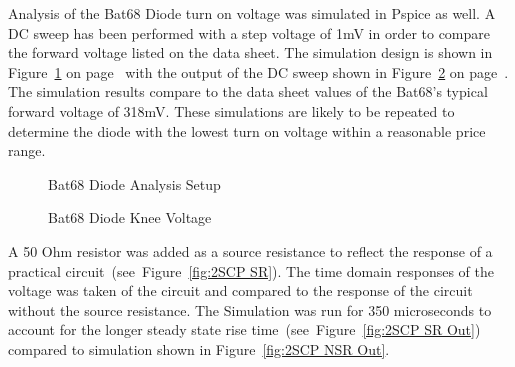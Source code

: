 \documentclass[12pt]{article}
\begin{document}
	\noindent Analysis of the Bat68 Diode turn on voltage was simulated in Pspice as well. A DC sweep has been performed with a step voltage of 1mV in order to compare the forward voltage listed on the data sheet. The simulation design is shown in Figure~\ref{fig:Bat68Analysis} on page~\pageref{fig:Bat68Analysis} with the output of the DC sweep shown in Figure~\ref{fig:Bat68Knee} on page~\pageref{fig:Bat68Knee}. The simulation results compare to the data sheet values of the Bat68's typical forward voltage of 318mV. These simulations are likely to be repeated to determine the diode with the lowest turn on voltage within a reasonable price range.

\vspace{0.5em}
\begin{figure}[H]
\caption{Bat68 Diode Analysis Setup}
\label{fig:Bat68Analysis}
\end{figure}

\vspace{0.5em}
\begin{figure}[H]
\caption{Bat68 Diode Knee Voltage}
\label{fig:Bat68Knee}
\end{figure}

\noindent A 50 Ohm resistor was added as a source resistance to reflect the response of a practical circuit~(see~Figure~\ref{fig:2SCP SR}). The time domain responses of the voltage was taken of the circuit and compared to the response of the circuit without the source resistance. The Simulation was run for 350 microseconds to account for the longer steady state rise time~(see~Figure~\ref{fig:2SCP SR Out}) compared to simulation shown in Figure~\ref{fig:2SCP NSR Out}.\\
\end{document}
